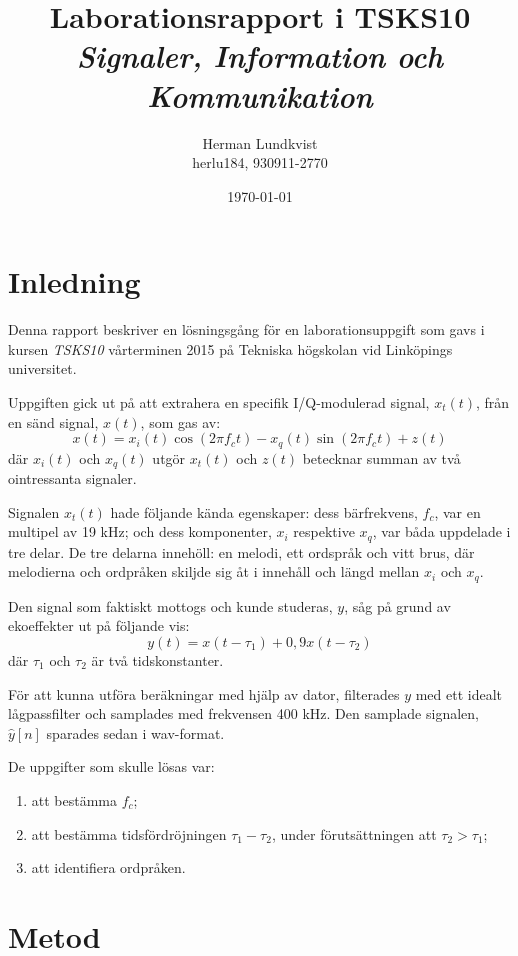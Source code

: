 \documentclass[10pt,twocolumn,a4paper]{article}
\title{Laborationsrapport i TSKS10 \emph{Signaler, Information och Kommunikation}}
\author{Herman Lundkvist \\ herlu184, 930911-2770 }
\date{\today}
\begin{document}
\newcommand{\yhat}{$\hat{y}[n]$\xspace}

\maketitle

\section{Inledning}

Denna rapport beskriver en lösningsgång för en laborationsuppgift som gavs i
kursen \emph{TSKS10} vårterminen 2015 på Tekniska högskolan vid Linköpings
universitet.

Uppgiften gick ut på att extrahera en specifik I/Q-modulerad signal, $x_t(t)$,
från en sänd signal, $x(t)$, som gas av:
\begin{equation}
x(t) = x_i(t) \cos(2 \pi f_ct) - x_q(t) \sin(2 \pi f_c t) + z(t)
\label{e1}
\end{equation}
där $x_i(t)$ och $x_q(t)$ utgör $x_t(t)$ och $z(t)$ betecknar
summan av två ointressanta signaler.

Signalen $x_t(t)$ hade följande kända egenskaper: dess bärfrekvens, $f_c$,
var en multipel av 19 kHz; och dess komponenter, $x_i$ respektive $x_q$,
var båda uppdelade i tre delar. De tre delarna innehöll: en melodi, ett
ordspråk och vitt brus, där melodierna och ordpråken skiljde sig åt i
innehåll och längd mellan $x_i$ och $x_q$.

Den signal som faktiskt mottogs och kunde studeras, $y$, såg på grund av
ekoeffekter ut på följande vis:
\begin{equation}
    y(t)=x(t - \tau_1) + 0,9 x(t - \tau_2)
\end{equation}
där $\tau_1$ och $\tau_2$ är två tidskonstanter.

För att kunna utföra beräkningar med hjälp av dator, filterades $y$ 
med ett idealt lågpassfilter och samplades med frekvensen 400 kHz.
Den samplade signalen, \yhat sparades sedan i wav-format.

De uppgifter som skulle lösas var:
\begin{enumerate}
\item att bestämma $f_c$;
\item att bestämma tidsfördröjningen $\tau_1-\tau_2$, under förutsättningen att
$\tau_2 > \tau_1$;
\item att identifiera ordpråken.
\end{enumerate}

\section{Metod}
\end{document}
